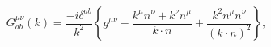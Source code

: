 \begin{equation}
G_{ab}^{\mu \nu }(k)=\frac{-i\delta ^{ab}}{k^{2}}\left\{ g^{\mu \nu }-\frac{
k^{\mu }n^{\nu }+k^{\nu }n^{\mu }}{k\cdot n}+\frac{k^{2}n^{\mu }n^{\nu }}{
(k\cdot n)^{2}}\right\} ,  \label{correct}
\end{equation}

